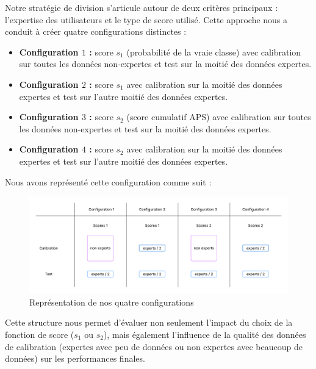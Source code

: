 \documentclass[a4paper,12pt]{article}
\begin{document}
Notre stratégie de division s'articule autour de deux critères principaux : l'expertise des utilisateurs et le type de score utilisé. Cette approche nous a conduit à créer quatre configurations distinctes : 
\begin{itemize}
    \item \textbf{Configuration $1$ :} score $s_1$ (probabilité de la vraie classe) avec calibration sur toutes les données non-expertes et test sur la moitié des données expertes.
    \item \textbf{Configuration $2$ :} score $s_1$ avec calibration sur la moitié des données expertes et test sur l'autre moitié des données expertes.
    \item \textbf{Configuration $3$ :} score $s_2$ (score cumulatif APS) avec calibration sur toutes les données non-expertes et test sur la moitié des données expertes.
    \item \textbf{Configuration $4$ :} score $s_2$ avec calibration sur la moitié des données expertes et test sur l'autre moitié des données expertes.
\end{itemize}

\vspace{0.2cm}

Nous avons représenté cette configuration comme suit : 
\begin{figure}[H]
    \centering
    \includegraphics[scale=0.6]{images/Models.png}
    \caption{Représentation de nos quatre configurations}
    \label{models}
  \end{figure}

\vspace{0.2cm}

Cette structure nous permet d'évaluer non seulement l'impact du choix de la fonction de score ($s_1$ ou $s_2$), mais également l'influence de la qualité des données de calibration (expertes avec peu de données ou non expertes avec beaucoup de données) sur les performances finales.

\vspace{0.2cm}
\end{document}
